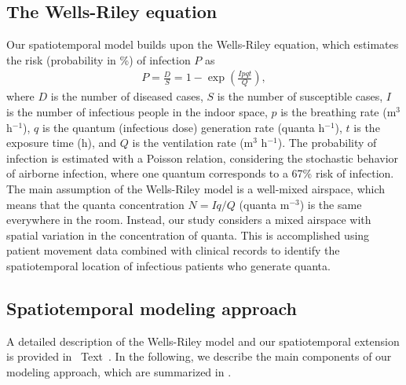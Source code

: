 \documentclass[fleqn,11pt]{wlscirep}
\begin{document}
\subsection{The Wells-Riley equation}

Our spatiotemporal model builds upon the Wells-Riley equation\cite{Riley1978AJE}, which estimates the risk (probability in \%) of infection $P$ as
\begin{align}
    P = \frac{D}{S} = 1 - \exp\left(\frac{Ipqt}{Q}\right),
\end{align}
where $D$ is the number of diseased cases, $S$ is the number of susceptible cases, $I$ is the number of infectious people in the indoor space, $p$ is the breathing rate (m$^3$ h$^{-1}$), $q$ is the quantum (infectious dose) generation rate (quanta h$^{-1}$), $t$ is the exposure time (h), and $Q$ is the ventilation rate (m$^3$ h$^{-1}$). The probability of infection is estimated with a Poisson relation, considering the stochastic behavior of airborne infection, where one quantum corresponds to a 67\% risk of infection. The main assumption of the Wells-Riley model is a well-mixed airspace, which means that the quanta concentration $N = Iq/Q$ (quanta m$^{-3}$) is the same everywhere in the room. Instead, our study considers a mixed airspace with spatial variation in the concentration of quanta. This is accomplished using patient movement data combined with clinical records to identify the spatiotemporal location of infectious patients who generate quanta.

\subsection{Spatiotemporal modeling approach}

A detailed description of the Wells-Riley model and our spatiotemporal extension is provided in \supp~Text~. In the following, we describe the main components of our modeling approach, which are summarized in .
\end{document}
